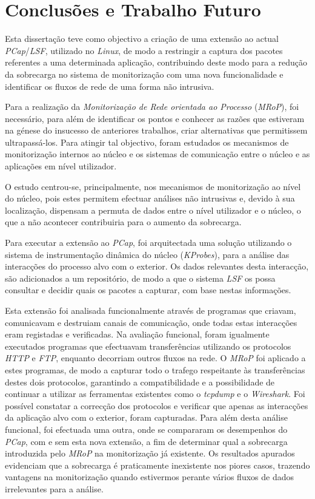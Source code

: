 \chapter{Conclusões e Trabalho Futuro}
\label{cap:conclusao}

Esta dissertação teve como objectivo a criação de uma extensão ao actual \textit{PCap}/\textit{LSF}, utilizado no \textit{Linux}, de modo a restringir a captura dos pacotes referentes a uma determinada aplicação, contribuindo deste modo para a redução da sobrecarga no sistema de monitorização com uma nova funcionalidade e identificar os fluxos de rede de uma forma não intrusiva.

Para a realização da \textit{Monitorização de Rede orientada ao Processo} (\textit{MRoP}), foi necessário, para além de identificar os pontos e conhecer as razões que estiveram na génese do insucesso de anteriores trabalhos, criar alternativas que permitissem ultrapassá-los.
Para atingir tal objectivo, foram estudados os mecanismos de monitorização internos ao núcleo e os sistemas de comunicação entre o núcleo e as aplicações em nível utilizador.

O estudo centrou-se, principalmente, nos mecanismos de monitorização ao nível do núcleo, pois estes permitem efectuar análises não intrusivas e, devido à sua localização, dispensam a permuta de dados entre o nível utilizador e o núcleo, o que a não acontecer contribuiria para o aumento da sobrecarga.

Para executar a extensão ao \textit{PCap}, foi arquitectada uma solução utilizando o sistema de instrumentação dinâmica do núcleo (\textit{KProbes}), para a análise das interacções do processo alvo com o exterior.
Os dados relevantes desta interacção, são adicionados a um repositório, de modo a que o sistema \textit{LSF} os possa consultar e decidir quais os pacotes a capturar, com base nestas informações.

Esta extensão foi analisada funcionalmente através de programas que criavam, comunicavam e destruiam canais de comunicação, onde todas estas interacções eram registadas e verificadas.
Na avaliação funcional, foram igualmente executados programas que efectuavam transferências utilizando os protocolos \textit{HTTP} e \textit{FTP}, enquanto decorriam outros fluxos na rede. 
O \textit{MRoP} foi aplicado a estes programas, de modo a capturar todo o trafego respeitante às transferências destes dois protocolos, garantindo a compatibilidade e a possibilidade de continuar a utilizar as ferramentas existentes como o \textit{tcpdump} e o \textit{Wireshark}.
Foi possível constatar a correcção dos protocolos e verificar que apenas as interacções da aplicação alvo com o exterior, foram capturadas.
Para além desta análise funcional, foi efectuada uma outra, onde se compararam os desempenhos do \textit{PCap}, com e sem esta nova extensão, a fim de determinar qual a sobrecarga introduzida pelo \textit{MRoP} na monitorização já existente.
Os resultados apurados evidenciam que a sobrecarga é praticamente inexistente nos piores casos, trazendo vantagens na monitorização quando estivermos perante vários fluxos de dados irrelevantes para a análise.

